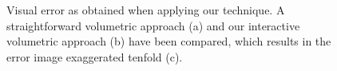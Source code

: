 \documentclass[journal]{vgtc}                %
\begin{document}
\begin{figure}
    \centering
    \caption{Visual error as obtained when applying our technique. A straightforward volumetric approach (a) and our interactive volumetric approach (b) have been compared, which results in the error image exaggerated tenfold (c).}
    \label{fig:heart-analysis}
\end{figure}
%
%
%
\end{document}
